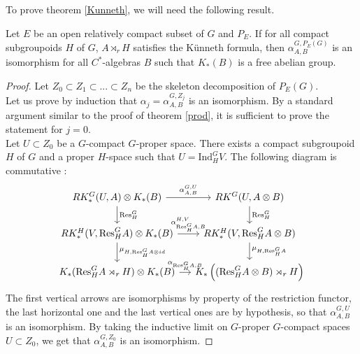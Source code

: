 To prove theorem \ref{Kunneth}, we will need the following result.

\begin{thm}\label{TopologicalKunneth}
Let $E$ be an open relatively compact subset of $G$ and $P_E$. If for all compact subgroupoids $H$ of $G$, $A\rtimes_r H$ satisfies the Künneth formula, then $\alpha_{A,B}^{G,P_E(G)}$ is an isomorphism for all $C^*$-algebras $B$ such that $K_*(B)$ is a free abelian group.
\end{thm}

\begin{proof}
Let $Z_0\subset Z_1\subset ... \subset Z_n $ be the skeleton decomposition of $P_E(G)$.\\

Let us prove by induction that $\alpha_j=\alpha^{G,Z_j}_{A,B}$ is an isomorphism. By a standard argument similar to the proof of theorem \ref{prod}, it is sufficient to prove the statement for $j=0$.\\

Let $U\subset Z_0$ be a $G$-compact $G$-proper space. There exists a compact subgroupoid $H$ of $G$ and a proper $H$-space such that $U = \text{Ind}_H^G V$. The following diagram is commutative :
\[\begin{tikzcd}[column sep = small] RK_*^G(U,A)\otimes K_*(B) \arrow{r}{\alpha_{A,B}^{G,U}} \arrow{d}{\text{Res}_H^G} & RK^G(U, A\otimes B) \arrow{d}{\text{Res}_H^G}\\
RK_*^H(V, \text{Res}_H^GA)\otimes K_*(B) \arrow{r}{\alpha_{\text{Res}_H^G A,B}^{H,V}} \arrow{d}{\mu_{H,\text{Res}_H^G A \otimes id}} & 
	RK_*^H(V, \text{Res}_H^G A\otimes B)\arrow{d}{\mu_{H,\text{Res}_H^G A }} \\
K_*(\text{Res}_H^G A\rtimes_r H)\otimes K_*(B)\arrow{r}{\alpha_{\text{Res}_H^G A,B}} & K_*\left((\text{Res}_H^G A\otimes B)\rtimes_r H\right) 
\end{tikzcd}\]
The first vertical arrows are isomorphisms by property of the restriction functor, the last horizontal one and the last vertical ones are by hypothesis, so that $\alpha_{A,B}^{G,U}$ is an isomorphism. By taking the inductive limit on $G$-proper $G$-compact spaces $U\subset Z_0$, we get that $\alpha_{A,B}^{G,Z_0}$ is an isomorphism.
\end{proof}

